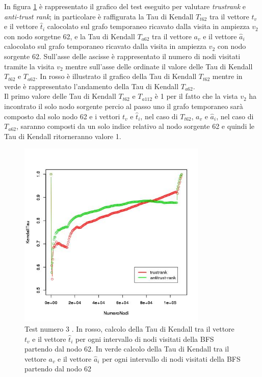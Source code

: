 In figura \ref{fig:test3coplotTrustAntiModeB62} è rappresentato il grafico del test eseguito per valutare \textit{trustrank} e \textit{anti-trust rank}; in particolare è raffigurata la Tau di Kendall \(T_{t62}\) tra il vettore \(t_v\) e il vettore \(\hat{t}_i\) calocolato sul grafo temporaneo ricavato dalla visita in ampiezza \(v_2\) con nodo sorgetne 62, e la Tau di Kendall \(T_{a62}\) tra il vettore \(a_v\) e il vettore \(\hat{a}_i\) calocolato sul grafo temporaneo ricavato dalla visita in ampiezza \(v_2\) con nodo sorgente 62. Sull'asse delle ascisse è rappresentato il numero di nodi visitati tramite la visita \(v_2\) mentre sull'asse delle ordinate il valore delle Tau di Kendall \(T_{t62}\) e \(T_{a62}\). In rosso è illustrato il grafico della Tau di Kendall \(T_{t62}\)  mentre in verde è rappresentato l'andamento della Tau di Kendall \(T_{a62}\).\\ Il primo valore delle Tau di Kendall \(T_{t62}\) e \(T_{a112}\) è 1 per il fatto che la vista \(v_2\) ha incontrato il solo nodo sorgente percio al passo uno 
il grafo temporaneo sarà composto dal solo nodo 62 e i vettori \(t_v\) e \(\hat{t}_i\), nel caso di \(T_{t62}\), \(a_v\) e \(\hat{a}_i\), nel caso di \(T_{a62}\), saranno composti da un solo indice relativo al nodo sorgente 62 e quindi le Tau di Kendall ritorneranno valore 1.
\begin{figure}
\centering
 \includegraphics[height=9cm]{immagini/test3/coplotTrustAnti_Mode1_set3776_62}
 \caption{Test numero 3 . In rosso, calcolo della Tau di Kendall  tra il vettore $t_v$ e il vettore $\hat{t}_i$ per ogni intervallo di nodi visitati della BFS partendo dal nodo 62. In verde calcolo della Tau di Kendall tra il vettore $a_v$ e il vettore $\hat{a}_i$ per ogni intervallo di nodi visitati della BFS partendo dal nodo 62}
 \label{fig:test3coplotTrustAntiModeB62}
\end{figure}
